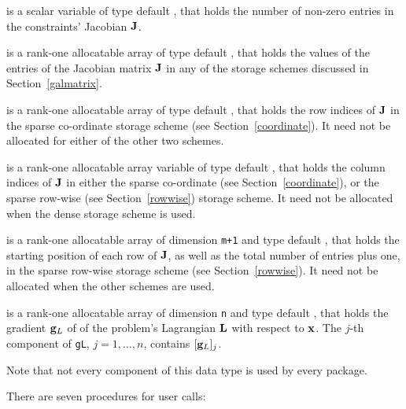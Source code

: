 \documentclass{galahad}
\begin{document}
\begin{description}
 is a scalar variable of type default \integer,
that holds the number of non-zero entries in the
constraints' Jacobian ${\mathbf{J}}$.

 is a rank-one allocatable array of type default \realdp, that holds
the values of the entries of the Jacobian matrix ${\mathbf{J}}$ in any of the
storage schemes discussed in Section~\ref{galmatrix}.

 is a rank-one allocatable array of type default \integer,
that holds the row indices of ${\mathbf{J}}$ in the sparse co-ordinate storage
scheme (see Section~\ref{coordinate}).
It need not be allocated for either of the other two schemes.

 is a rank-one allocatable array variable of type default \integer,
that holds the column indices of ${\mathbf{J}}$ in either the sparse co-ordinate
(see Section~\ref{coordinate}), or the sparse row-wise
(see Section~\ref{rowwise}) storage scheme.
It need not be allocated when the dense storage scheme is used.

 is a rank-one allocatable array of dimension {\tt m+1} and type
default \integer, that holds the
starting position of each row of ${\mathbf{J}}$, as well
as the total number of entries plus one, in the sparse row-wise storage
scheme (see Section~\ref{rowwise}). It need not be allocated when the
other schemes are used.

 is a rank-one allocatable array of dimension {\tt n} and type
default \realdp, that holds the gradient ${\mathbf{g}}_L$
of of the problem's Lagrangian ${\mathbf{L}}$ with respect to ${\mathbf{x}}$.
The $j$-th component of
{\tt gL}, $j = 1,  \ldots ,  n$, contains $[{\mathbf{g}}_L]_{j}$.

\end{description}

\noindent
Note that not every component of this data type is used by every package.


\galarguments
There are seven procedures for user calls:
\end{document}
